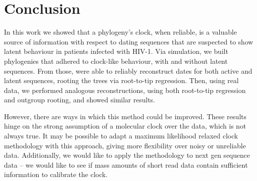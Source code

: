 \section{Conclusion} \label{sec:conclusion}
In this work we showed that a phylogeny's clock, when reliable, is a valuable source of information with respect to dating sequences that are suspected to show latent behaviour in patients infected with HIV-1. 
Via simulation, we built phylogenies that adhered to clock-like behaviour, with and without latent sequences.
From those, were able to reliably reconstruct dates for both active and latent sequences, rooting the trees via root-to-tip regression.
Then, using real data, we performed analogous reconstructions, using both root-to-tip regression and outgroup rooting, and showed similar results.

However, there are ways in which this method could be improved. 
These results hinge on the strong assumption of a molecular clock over the data, which is not always true. 
It may be possible to adapt a maximum likelihood relaxed clock methodology with this approach, giving more flexibility over noisy or unreliable data. 
Additionally, we would like to apply the methodology to next gen sequence data -- we would like to see if mass amounts of short read data contain sufficient information to calibrate the clock.

